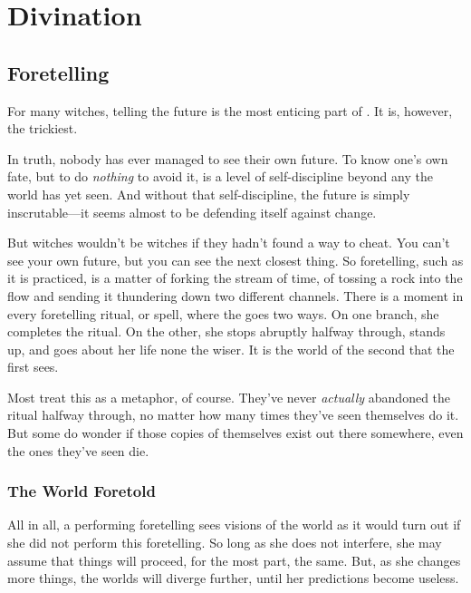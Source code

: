 \chapter{Divination}

\section{Foretelling}

For many witches, telling the future is the most enticing part of .
It is, however, the trickiest.

In truth, nobody has ever managed to see their own future.
To know one's own fate, but to do \emph{nothing} to avoid it, is a level of self-discipline beyond any  the world has yet seen.
And without that self-discipline, the future is simply inscrutable---it seems almost to be defending itself against change.

But witches wouldn't be witches if they hadn't found a way to cheat.
You can't see your own future, but you can see the next closest thing.
So foretelling, such as it is practiced, is a matter of forking the stream of time, of tossing a rock into the flow and sending it thundering down two different channels.
There is a moment in every foretelling ritual, or spell, where the  goes two ways.
On one branch, she completes the ritual.
On the other, she stops abruptly halfway through, stands up, and goes about her life none the wiser.
It is the world of the second  that the first  sees.

Most  treat this as a metaphor, of course.
They've never \emph{actually} abandoned the ritual halfway through, no matter how many times they've seen themselves do it.
But some do wonder if those copies of themselves exist out there somewhere, even the ones they've seen die.

\subsection{The World Foretold}

All in all, a  performing foretelling sees visions of the world as it would turn out if she did not perform this foretelling.
So long as she does not interfere, she may assume that things will proceed, for the most part, the same.
But, as she changes more things, the worlds will diverge further, until her predictions become useless.


